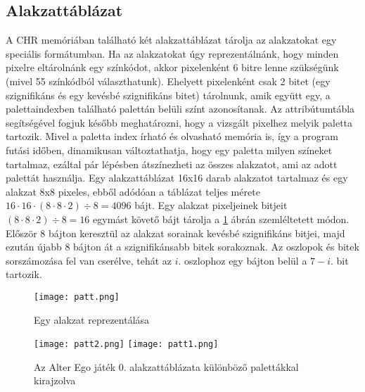 \subsection{Alakzattáblázat}

A CHR memóriában található két alakzattáblázat tárolja  az alakzatokat egy speciális formátumban. Ha az alakzatokat úgy reprezentálnánk, hogy minden pixelre eltárolnánk egy színkódot, akkor pixelenként 6 bitre lenne szükségünk (mivel 55 színkódból választhatunk). Ehelyett pixelenként csak 2 bitet (egy szignifikáns és egy kevésbé szignifikáns bitet) tárolnunk, amik együtt egy, a palettaindexben található palettán belüli színt azonosítanak. Az attribútumtábla segítségével fogjuk később meghatározni, hogy a vizsgált pixelhez melyik paletta tartozik. Mivel a paletta index írható és olvasható memória is, így a program futási időben, dinamikusan változtathatja, hogy egy paletta milyen színeket tartalmaz, ezáltal pár lépésben átszínezheti az összes alakzatot, ami az adott palettát használja.
Egy alakzattáblázat 16x16 darab alakzatot tartalmaz és egy alakzat 8x8 pixeles, ebből adódóan a táblázat teljes mérete $16\cdot16\cdot(8\cdot8\cdot2)\div8 = 4096$ bájt. Egy alakzat pixeljeinek bitjeit $(8\cdot8\cdot2)\div8 = 16$ egymást követő bájt tárolja a \ref{fig:patt} ábrán szemléltetett módon. Először 8 bájton keresztül az alakzat sorainak kevésbé szignifikáns bitjei, majd ezután újabb 8 bájton át a szignifikánsabb bitek sorakoznak. Az oszlopok és bitek sorszámozása fel van cserélve, tehát az $i.$ oszlophoz egy bájton belül a $7-i.$ bit tartozik.  

\begin{figure}[H]
	\centering
	\texttt{[image: patt.png]}
	\caption{Egy alakzat reprezentálása}
	\label{fig:patt}
\end{figure}


\begin{figure}[H]
	\centering
	\texttt{[image: patt2.png]}
	\hspace{5pt}
	\texttt{[image: patt1.png]}
	\caption{Az Alter Ego játék 0. alakzattáblázata különböző palettákkal kirajzolva}
\end{figure}


